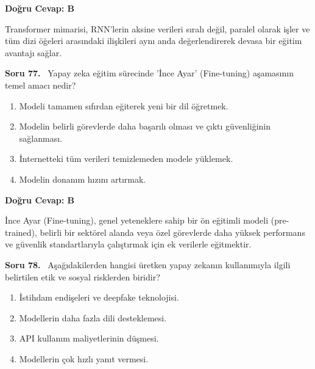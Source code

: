 \documentclass[11pt,a4paper,openany]{book}
\begin{document}
\vspace{4pt}
\begin{tcolorbox}[title=Cevap ve Açıklama, colback=gray!3!white, colframe=primarycolor!90!black, arc=2mm, fonttitle=\bfseries\sffamily, top=6pt, bottom=6pt]
    \textbf{Doğru Cevap: B}

    \vspace{2pt}
    Transformer mimarisi, RNN'lerin aksine verileri sıralı değil, paralel olarak işler ve tüm dizi öğeleri arasındaki ilişkileri aynı anda değerlendirerek devasa bir eğitim avantajı sağlar.
\end{tcolorbox}
\vspace{10pt}
\needspace{5cm}
\vspace{8pt}
\noindent\textbf{\large\sffamily Soru 77.} \ Yapay zeka eğitim sürecinde 'İnce Ayar' (Fine-tuning) aşamasının temel amacı nedir?

\begin{enumerate}[label=\Alph*), leftmargin=25pt, topsep=4pt, itemsep=2pt]
        \item Modeli tamamen sıfırdan eğiterek yeni bir dil öğretmek.
        \item Modelin belirli görevlerde daha başarılı olması ve çıktı güvenliğinin sağlanması.
        \item İnternetteki tüm verileri temizlemeden modele yüklemek.
        \item Modelin donanım hızını artırmak.
\end{enumerate}

\vspace{4pt}
\begin{tcolorbox}[title=Cevap ve Açıklama, colback=gray!3!white, colframe=primarycolor!90!black, arc=2mm, fonttitle=\bfseries\sffamily, top=6pt, bottom=6pt]
    \textbf{Doğru Cevap: B}

    \vspace{2pt}
    İnce Ayar (Fine-tuning), genel yeteneklere sahip bir ön eğitimli modeli (pre-trained), belirli bir sektörel alanda veya özel görevlerde daha yüksek performans ve güvenlik standartlarıyla çalıştırmak için ek verilerle eğitmektir.
\end{tcolorbox}
\vspace{10pt}
\needspace{5cm}
\vspace{8pt}
\noindent\textbf{\large\sffamily Soru 78.} \ Aşağıdakilerden hangisi üretken yapay zekanın kullanımıyla ilgili belirtilen etik ve sosyal risklerden biridir?

\begin{enumerate}[label=\Alph*), leftmargin=25pt, topsep=4pt, itemsep=2pt]
        \item İstihdam endişeleri ve deepfake teknolojisi.
        \item Modellerin daha fazla dili desteklemesi.
        \item API kullanım maliyetlerinin düşmesi.
        \item Modellerin çok hızlı yanıt vermesi.
\end{enumerate}
\end{document}
